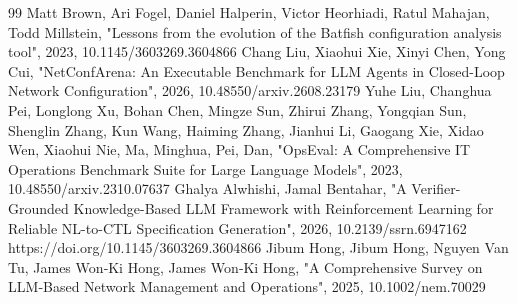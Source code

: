 \documentclass[conference]{IEEEtran}
\begin{document}
\begin{thebibliography}{99}
 Matt Brown, Ari Fogel, Daniel Halperin, Victor Heorhiadi, Ratul Mahajan, Todd Millstein, "Lessons from the evolution of the Batfish configuration analysis tool", 2023, 10.1145/3603269.3604866
 Chang Liu, Xiaohui Xie, Xinyi Chen, Yong Cui, "NetConfArena: An Executable Benchmark for LLM Agents in Closed-Loop Network Configuration", 2026, 10.48550/arxiv.2608.23179
 Yuhe Liu, Changhua Pei, Longlong Xu, Bohan Chen, Mingze Sun, Zhirui Zhang, Yongqian Sun, Shenglin Zhang, Kun Wang, Haiming Zhang, Jianhui Li, Gaogang Xie, Xidao Wen, Xiaohui Nie, Ma, Minghua, Pei, Dan, "OpsEval: A Comprehensive IT Operations Benchmark Suite for Large Language Models", 2023, 10.48550/arxiv.2310.07637
 Ghalya Alwhishi, Jamal Bentahar, "A Verifier-Grounded Knowledge-Based LLM Framework with Reinforcement Learning for Reliable NL-to-CTL Specification Generation", 2026, 10.2139/ssrn.6947162
 https://doi.org/10.1145/3603269.3604866
 Jibum Hong, Jibum Hong, Nguyen Van Tu, James Won‐Ki Hong, James Won‐Ki Hong, "A Comprehensive Survey on LLM‐Based Network Management and Operations", 2025, 10.1002/nem.70029
\end{thebibliography}
\end{document}
